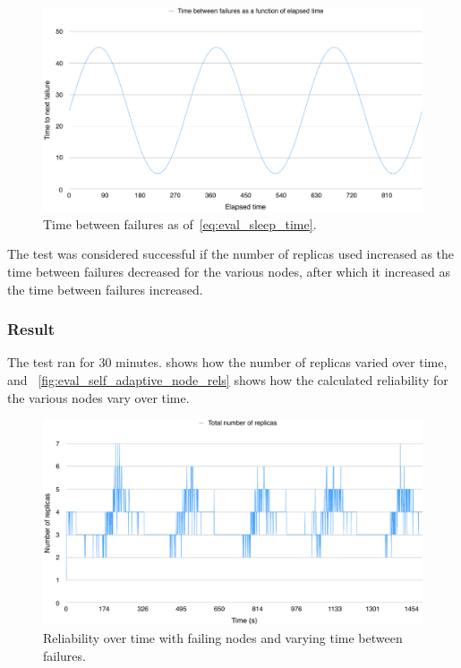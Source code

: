 \documentclass{cslthse-msc}
\begin{document}
\begin{figure}[!hbt]
\centering
\includegraphics[scale=0.5]{images/sinus_failure_times.pdf}
\caption{Time between failures as of~\cref{eq:eval_sleep_time}.} \label{fig:eval_sleep_time}
\end{figure}

The test was considered successful if the number of replicas used increased as the time between failures decreased for the various nodes, after which it increased as the time between failures increased.

\subsubsection*{Result}
The test ran for 30 minutes.  shows how the number of replicas varied over time, and ~\cref{fig:eval_self_adaptive_node_rels} shows how the calculated reliability for the various nodes vary over time. 

\begin{figure}[!hbt]
\centering
\includegraphics[scale=0.5]{images/results/self_adaptive_replicas.pdf}
\caption{Reliability over time with failing nodes and varying time between failures.} \label{fig:eval_self_adaptive_rel}
\end{figure}
\end{document}
